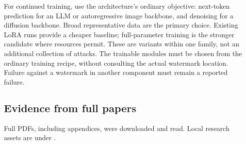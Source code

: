 For continued training, use the architecture's ordinary objective:
next-token prediction for an LLM or autoregressive image backbone, and
denoising for a diffusion backbone. Broad representative data are the
primary choice. Existing LoRA runs provide a cheaper baseline;
full-parameter training is the stronger candidate where resources
permit. These are variants within one family, not an additional
collection of attacks. The trainable modules must be chosen from the
ordinary training recipe, without consulting the actual watermark
location. Failure against a watermark in another component must remain a
reported failure.

\subsection{Evidence from full
papers}\label{record-docs-watermark-removal-literature-md-evidence-from-full-papers}

Full PDFs, including appendices, were downloaded and read. Local
research assets are under
\texttt{}.

